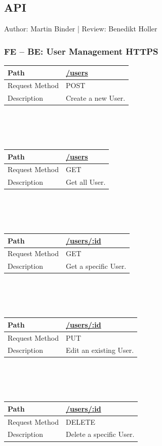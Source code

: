 \documentclass{scrreprt}
\begin{document}
\subsection{API}
\label{api}
Author: Martin Binder | Review: Benedikt Holler
\subsubsection{FE -- BE: User Management HTTPS}
\begin{tabularx}{12cm}{l|l}
	Path & \url{/users} \\\hline
	Request Method & POST \\\hline
	Description & Create a new User.
\end{tabularx}
\\
\\ \\
\begin{tabularx}{12cm}{l|l}
	Path & \url{/users} \\\hline
	Request Method & GET \\\hline
	Description & Get all User.
\end{tabularx}
\\
\\ \\
\begin{tabularx}{12cm}{l|l}
	Path & \url{/users/:id} \\\hline
	Request Method & GET \\\hline
	Description & Get a specific User.
\end{tabularx}
\\
\\ \\
\begin{tabularx}{12cm}{l|l}
	Path & \url{/users/:id} \\\hline
	Request Method & PUT  \\\hline
	Description & Edit an existing User.
\end{tabularx}
\\
\\ \\
\begin{tabularx}{12cm}{l|l}
	Path & \url{/users/:id} \\\hline
	Request Method & DELETE \\\hline
	Description & Delete a specific User.
\end{tabularx}
\\
\\ \\
\end{document}
